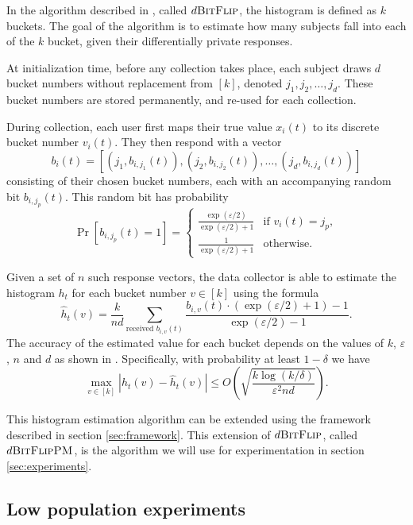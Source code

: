 \documentclass[12pt]{article}
\renewcommand{\epsilon}{\varepsilon}
\begin{document}
In the algorithm described in \cite{microsoft_telemetry}, called $d\textsc{BitFlip}$, the histogram is defined as $k$ buckets. The goal of the algorithm is to estimate how many subjects fall into each of the $k$ bucket, given their differentially private responses.

At initialization time, before any collection takes place, each subject draws $d$ bucket numbers without replacement from $[k]$, denoted $j_1,j_2,\dots,j_d$. These bucket numbers are stored permanently, and re-used for each collection.

During collection, each user first maps their true value $x_i(t)$ to its discrete bucket number $v_i(t)$. They then respond with a vector $$b_i(t)=\left[ (j_1, b_{i,j_1}(t)), (j_2, b_{i,j_2}(t)), \dots, (j_d, b_{i,j_d}(t)) \right]$$
consisting of their chosen bucket numbers, each with an accompanying random bit $b_{i,j_p}(t)$. This random bit has probability
$$\Pr[b_{i,j_p}(t)=1]=\begin{cases}
    \frac{\exp(\epsilon/2)}{\exp(\epsilon / 2) + 1} & \text{if } v_i(t) = j_p, \\
    \frac{1}{\exp(\epsilon/2) + 1} & \text{otherwise.}
\end{cases}$$

Given a set of $n$ such response vectors, the data collector is able to estimate the histogram $h_t$ for each bucket number $v \in [k]$ using the formula
\begin{equation*}
    \hat{h}_t(v) = \frac{k}{nd} \sum_{\text{received } b_{i,v}(t)} \frac{b_{i,v}(t)\cdot (\exp(\epsilon/2) + 1) - 1}{\exp(\epsilon/2) - 1}.
\end{equation*}
The accuracy of the estimated value for each bucket depends on the values of $k$, $\epsilon$, $n$ and $d$ as shown in \cite[sec.~2.2]{microsoft_telemetry}. Specifically, with probability at least $1 - \delta$ we have
$$
\max_{v \in [k]} |h_t(v) - \hat{h}_t(v)| \leq O\left( \sqrt{\frac{k \log(k/\delta)}{\epsilon^2nd}} \right).
$$ \bigskip

This histogram estimation algorithm can be extended using the framework described in section \ref{sec:framework}. This extension of $d\textsc{BitFlip}$, called $d\textsc{BitFlipPM}$, is the algorithm we will use for experimentation in section \ref{sec:experiments}.

\subsection{Low population experiments \label{sec:experiments}}
\end{document}
